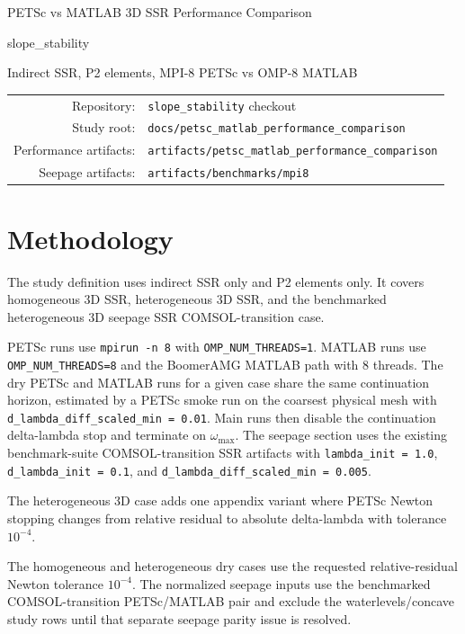 \documentclass[11pt,a4paper]{article}
\newcommand{\code}[1]{\nolinkurl{#1}}
\begin{document}
\begin{titlepage}
\centering
{\Large PETSc vs MATLAB 3D SSR Performance Comparison\par}
\vspace{0.8cm}
{\large slope\_stability\par}
\vspace{1.0cm}
{\large Indirect SSR, P2 elements, MPI-8 PETSc vs OMP-8 MATLAB\par}
\vfill
\begin{tabular}{rl}
Repository: & \code{slope\_stability} checkout \\
Study root: & \code{docs/petsc\_matlab\_performance\_comparison} \\
Performance artifacts: & \code{artifacts/petsc\_matlab\_performance\_comparison} \\
Seepage artifacts: & \code{artifacts/benchmarks/mpi8} \\
\end{tabular}
\vfill
\end{titlepage}

\tableofcontents
\clearpage

\section{Methodology}
The study definition uses indirect SSR only and P2 elements only. It covers homogeneous 3D SSR, heterogeneous 3D SSR, and the benchmarked heterogeneous 3D seepage SSR COMSOL-transition case.

PETSc runs use \code{mpirun -n 8} with \code{OMP\_NUM\_THREADS=1}. MATLAB runs use \code{OMP\_NUM\_THREADS=8} and the BoomerAMG MATLAB path with 8 threads. The dry PETSc and MATLAB runs for a given case share the same continuation horizon, estimated by a PETSc smoke run on the coarsest physical mesh with \code{d\_lambda\_diff\_scaled\_min = 0.01}. Main runs then disable the continuation delta-lambda stop and terminate on \(\omega_{\max}\). The seepage section uses the existing benchmark-suite COMSOL-transition SSR artifacts with \code{lambda\_init = 1.0}, \code{d\_lambda\_init = 0.1}, and \code{d\_lambda\_diff\_scaled\_min = 0.005}.

The heterogeneous 3D case adds one appendix variant where PETSc Newton stopping changes from relative residual to absolute delta-lambda with tolerance \(10^{-4}\).

The homogeneous and heterogeneous dry cases use the requested relative-residual Newton tolerance \(10^{-4}\). The normalized seepage inputs use the benchmarked COMSOL-transition PETSc/MATLAB pair and exclude the waterlevels/concave study rows until that separate seepage parity issue is resolved.
\end{document}

